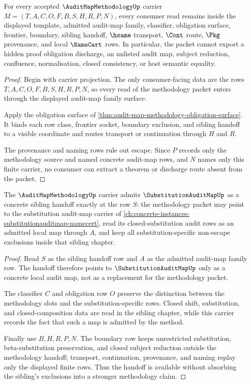 \begin{theorem}
\label{thm:audit-map-methodology-boundary-nonescape}
For every accepted $\AuditMapMethodologyUp$ carrier
$M=(T,A,C,O,F,B,S,H,R,P,N)$, every consumer read remains inside the displayed
template, admitted audit-map family, classifier, obligation surface, frontier,
boundary, sibling handoff, $\hsame$ transport, $\Cont$ route, $\Pkg$
provenance, and local $\NameCert$ rows. In particular, the packet cannot
export a hidden proof obligation discharge, an unlisted audit map, subject
reduction, confluence, normalisation, closed consistency, or host semantic
equality.
\end{theorem}
\begin{proof}
Begin with carrier projection. The only consumer-facing data are the rows
$T,A,C,O,F,B,S,H,R,P,N$, so every read of the methodology packet enters
through the displayed audit-map family surface.

Apply the obligation surface of
\autoref{thm:audit-map-methodology-obligation-surface}. It binds each row
class, frontier socket, boundary exclusion, and sibling handoff to a visible
coordinate and routes transport or continuation through $H$ and $R$.

The provenance and naming rows rule out escape. Since $P$ records only the
methodology source and named concrete audit-map rows, and $N$ names only this
finite carrier, no consumer can extract a theorem or discharge route absent
from the packet.
\end{proof}

\begin{theorem}
\label{thm:audit-map-methodology-substitution-handoff}
The $\AuditMapMethodologyUp$ carrier admits $\SubstitutionAuditMapUp$ as a
concrete sibling handoff exactly at the row $S$: the methodology packet may
point to the substitution audit-map carrier of
\autoref{ch:concrete-instances-substitutionauditmap-namecert}, read its
closed-substitution audit rows as an admitted local map through $A$, and keep
all substitution-specific non-escape exclusions inside that sibling chapter.
\end{theorem}
\begin{proof}
Read $S$ as the sibling handoff row and $A$ as the admitted audit-map family
row. The handoff therefore points to $\SubstitutionAuditMapUp$ only as a
concrete local audit map, not as a replacement for the methodology packet.

The classifier $C$ and obligation row $O$ preserve the distinction between the
methodology slots and the substitution-specific rows. Closed shift,
substitution, and closed-composition data are read in the sibling chapter,
while this carrier records the fact that such a map is admitted by the method.

Finally use $B,H,R,P,N$. The boundary row keeps unrestricted substitution,
beta-substitution preservation, and closed subject reduction outside the
methodology handoff; transport, continuation, provenance, and naming replay
only the displayed finite rows. Thus the handoff is available without
absorbing the sibling's exclusions into a stronger methodology claim.
\end{proof}


